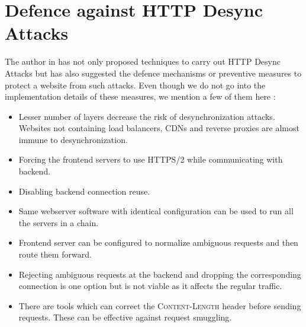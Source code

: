 \chapter{Defence against HTTP Desync Attacks}
The author in \cite{b6} has not only proposed techniques to carry out HTTP Desync Attacks but has also suggested the defence mechanisms or preventive measures to protect a website from such attacks. Even though we do not go into the implementation details of these measures, we mention a few of them here :
\begin{itemize}
	\item Lesser number of layers decrease the risk of desynchronization attacks. Websites not containing load balancers, CDNs and reverse proxies are almost immune to desynchronization. 
	\item Forcing the frontend servers to use HTTPS/2 \cite{b15} while communicating with backend. 
	\item Disabling backend connection reuse.
	\item Same webserver software with identical configuration can be used to run all the servers in a chain. 
	\item Frontend server can be configured to normalize ambiguous requests and then route them forward. 
	\item Rejecting ambiguous requests at the backend and dropping the corresponding connection is one option but is not viable as it affects the regular traffic. 
	\item There are tools which can correct the \textsc{Content-Length} header before sending requests. These can be effective against request smuggling. 
\end{itemize}

